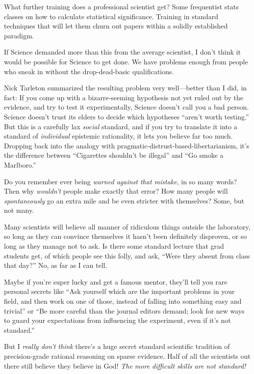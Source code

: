 {
 What further training does a professional scientist get? Some
frequentist stats classes on how to calculate statistical significance.
Training in standard techniques that will let them churn out papers
within a solidly established paradigm.}

{
 If Science demanded more than this from the average scientist, I
don't think it would be possible for Science to get
done. We have problems enough from people who sneak in without the
drop-dead-basic qualifications.}

{
 Nick Tarleton summarized the resulting problem very well---better
than I did, in fact: If you come up with a bizarre-seeming hypothesis
not yet ruled out by the evidence, and try to test it experimentally,
Science doesn't call you a bad person. Science
doesn't trust its elders to decide which hypotheses
``aren't worth
testing.'' But this is a carefully lax
\textit{social} standard, and if you try to translate it into a
standard of \textit{individual} epistemic rationality, it lets you
believe far too much. Dropping back into the analogy with
pragmatic-distrust-based-libertarianism, it's the
difference between ``Cigarettes
shouldn't be illegal'' and
``Go smoke a Marlboro.''}

{
 Do you remember ever being \textit{warned against that mistake},
in so many words? Then why \textit{wouldn't} people
make exactly that error? How many people will \textit{spontaneously} go
an extra mile and be even stricter with themselves? Some, but not
many.}

{
 Many scientists will believe all manner of ridiculous things
outside the laboratory, so long as they can convince themselves it
hasn't been definitely disproven, or so long as they
manage not to ask. Is there some standard lecture that grad students
get, of which people see this folly, and ask, ``Were
they absent from class that day?'' No, as far as I
can tell.}

{
 Maybe if you're super lucky and get a famous
mentor, they'll tell you rare personal secrets like
``Ask yourself which are the important problems in
your field, and then work on one of those, instead of falling into
something easy and trivial'' or ``Be
more careful than the journal editors demand; look for new ways to
guard your expectations from influencing the experiment, even if
it's not standard.''}

{
 But I \textit{really don't think}
there's a huge secret standard scientific tradition of
precision-grade rational reasoning on sparse evidence. Half of all the
scientists out there still believe they believe in God! \textit{The
more difficult skills are not standard!}}

